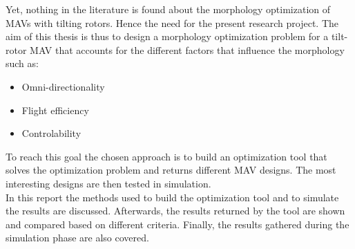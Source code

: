 Yet, nothing in the literature is found about the morphology optimization
of MAVs with tilting rotors. Hence the need for the present research project.
The aim of this thesis is thus to design a morphology optimization problem for
a tilt-rotor MAV that accounts for the different factors that influence the
morphology such as:

\begin{itemize}
\item Omni-directionality
\item Flight efficiency
\item Controlability
\end{itemize}

To reach this goal the chosen approach is to build an optimization tool that solves
the optimization problem and returns different MAV designs. The most interesting
designs are then tested in simulation.\\
In this report the methods used to build the optimization tool and to simulate
the results are discussed. Afterwards, the results returned by the tool are shown
and compared based on different criteria. Finally, the results gathered during
the simulation phase are also covered.
